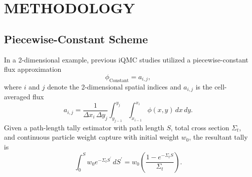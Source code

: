 \documentclass{anstrans}
\begin{document}
\section{METHODOLOGY}
\subsection{Piecewise-Constant Scheme}
In a 2-dimensional example, previous iQMC studies utilized a piecewise-constant flux approximation
\begin{equation}
    \phi_{\mathrm{Constant}} = a_{i,j},
\end{equation}
where $i$ and $j$ denote the 2-dimensional spatial indices and $a_{i,j}$ is the cell-averaged flux
\begin{equation}\label{eq:aij}
    a_{i,j} = \frac{1}{\Delta x_{i} \, \Delta y_{j}} \int_{y_{j-1}}^{y_{j}}\int_{x_{i-1}}^{x_{i}} \phi(x,y) \, dx \, dy .
\end{equation}
Given a path-length tally estimator with path length $S$, total cross section $\Sigma_t$, and continuous particle weight capture with initial weight $w_0$, the resultant tally is
\begin{equation}
    \int_{0}^{S} w_0 e^{-\Sigma_t S^\prime} \, dS^\prime = w_0 \left(\frac{1-e^{-\Sigma_t S}}{\Sigma_t} \right) .
\end{equation}
\end{document}
